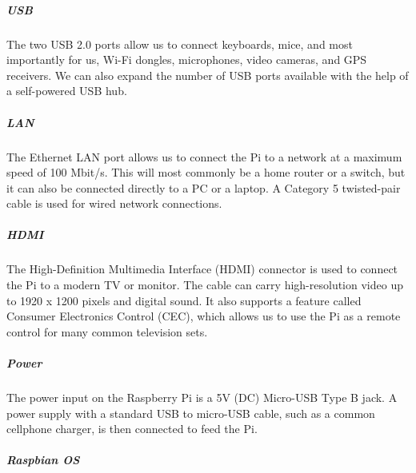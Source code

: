 \subparagraph*{USB}
\hfill \break
The two USB 2.0 ports allow us to connect keyboards, mice, and most importantly
for us, Wi-Fi dongles, microphones, video cameras, and GPS receivers. We can also
expand the number of USB ports available with the help of a self-powered USB hub.\cite{12}

\subparagraph*{LAN}
\hfill \break
The Ethernet LAN port allows us to connect the Pi to a network at a maximum speed
of 100 Mbit/s. This will most commonly be a home router or a switch, but it can also
be connected directly to a PC or a laptop. A Category 5 twisted-pair cable is used for
wired network connections.\cite{12}

\subparagraph*{HDMI}
\hfill \break
The High-Definition Multimedia Interface (HDMI) connector is used to connect the
Pi to a modern TV or monitor. The cable can carry high-resolution video up to 1920 x
1200 pixels and digital sound. It also supports a feature called Consumer Electronics
Control (CEC), which allows us to use the Pi as a remote control for many common
television sets.\cite{12}

\subparagraph*{Power}
\hfill \break
The power input on the Raspberry Pi is a 5V (DC) Micro-USB Type B jack. A power
supply with a standard USB to micro-USB cable, such as a common cellphone
charger, is then connected to feed the Pi.\cite{12}

\subparagraph*{Raspbian OS}

